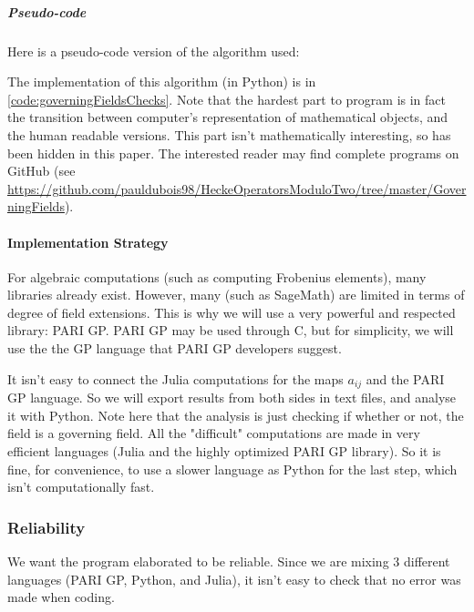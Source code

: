 \subparagraph{Pseudo-code}
\label{algo:governingFieldsChecks}
Here is a pseudo-code version of the algorithm used:
\begin{algorithmic}
	\color{CodeColor}
		\EndIf
	\EndFor
		\EndIf
	\EndFor
\end{algorithmic}
The implementation of this algorithm (in Python) is in \ref{code:governingFieldsChecks}.
Note that the hardest part to program is in fact the transition between computer's representation of mathematical objects, and the human readable versions. This part isn't mathematically interesting, so has been hidden in this paper. The interested reader may find complete programs on GitHub (see \url{https://github.com/pauldubois98/HeckeOperatorsModuloTwo/tree/master/GoverningFields}).

\paragraph{Implementation Strategy}
For algebraic computations (such as computing Frobenius elements), many libraries already exist.
However, many (such as SageMath) are limited in terms of degree of field extensions.
This is why we will use a very powerful and respected library: PARI GP.
PARI GP may be used through C, but for simplicity, we will use the the GP language that PARI GP developers suggest.

It isn't easy to connect the Julia computations for the maps $a_{ij}$ and the PARI GP language.
So we will export results from both sides in text files, and analyse it with Python.
Note here that the analysis is just checking if whether or not, the field is a governing field.
All the "difficult" computations are made in very efficient languages (Julia and the highly optimized PARI GP library).
So it is fine, for convenience, to use a slower language as Python for the last step, which isn't computationally fast.

\subsubsection{Reliability}
We want the program elaborated to be reliable.
Since we are mixing 3 different languages (PARI GP, Python, and Julia), it isn't easy to check that no error was made when coding.

